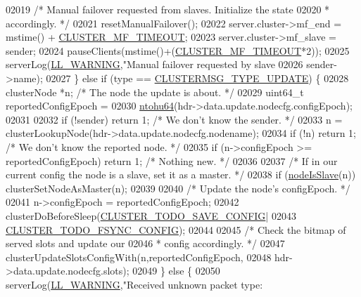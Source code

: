 \begin{DoxyCode}
{{{{{{{{{{{{{{{{{{{{{{{{{{{{{{{{{{02019         \textcolor{comment}{/* Manual failover requested from slaves. Initialize the state}
02020 \textcolor{comment}{         * accordingly. */}
02021         resetManualFailover();
02022         server.cluster->mf\_end = mstime() + \hyperlink{cluster_8h_a869ee97118edc95fc7ba2abe472ef79e}{CLUSTER\_MF\_TIMEOUT};
02023         server.cluster->mf\_slave = sender;
02024         pauseClients(mstime()+(\hyperlink{cluster_8h_a869ee97118edc95fc7ba2abe472ef79e}{CLUSTER\_MF\_TIMEOUT}*2));
02025         serverLog(\hyperlink{server_8h_a31229b9334bba7d6be2a72970967a14b}{LL\_WARNING},\textcolor{stringliteral}{"Manual failover requested by slave %
02026             sender->name);
02027     \} \textcolor{keywordflow}{else} \textcolor{keywordflow}{if} (type == \hyperlink{cluster_8h_a51dc58bb78128fcae1751d654130ec0f}{CLUSTERMSG\_TYPE\_UPDATE}) \{
02028         clusterNode *n; \textcolor{comment}{/* The node the update is about. */}
02029         uint64\_t reportedConfigEpoch =
02030                     \hyperlink{endianconv_8h_ab6e7416a2faac85cd6d50180e7348a1b}{ntohu64}(hdr->data.update.nodecfg.configEpoch);
02031 
02032         \textcolor{keywordflow}{if} (!sender) \textcolor{keywordflow}{return} 1;  \textcolor{comment}{/* We don't know the sender. */}
02033         n = clusterLookupNode(hdr->data.update.nodecfg.nodename);
02034         \textcolor{keywordflow}{if} (!n) \textcolor{keywordflow}{return} 1;   \textcolor{comment}{/* We don't know the reported node. */}
02035         \textcolor{keywordflow}{if} (n->configEpoch >= reportedConfigEpoch) \textcolor{keywordflow}{return} 1; \textcolor{comment}{/* Nothing new. */}
02036 
02037         \textcolor{comment}{/* If in our current config the node is a slave, set it as a master. */}
02038         \textcolor{keywordflow}{if} (\hyperlink{cluster_8h_a3c99881f6892130c902b42b1f84a0e11}{nodeIsSlave}(n)) clusterSetNodeAsMaster(n);
02039 
02040         \textcolor{comment}{/* Update the node's configEpoch. */}
02041         n->configEpoch = reportedConfigEpoch;
02042         clusterDoBeforeSleep(\hyperlink{cluster_8h_a0ae5ff08fbae3c655012b4de8bfc327d}{CLUSTER\_TODO\_SAVE\_CONFIG}|
02043                              \hyperlink{cluster_8h_accc9a00230cd04789db2398bb3ab715a}{CLUSTER\_TODO\_FSYNC\_CONFIG});
02044 
02045         \textcolor{comment}{/* Check the bitmap of served slots and update our}
02046 \textcolor{comment}{         * config accordingly. */}
02047         clusterUpdateSlotsConfigWith(n,reportedConfigEpoch,
02048             hdr->data.update.nodecfg.slots);
02049     \} \textcolor{keywordflow}{else} \{
02050         serverLog(\hyperlink{server_8h_a31229b9334bba7d6be2a72970967a14b}{LL\_WARNING},\textcolor{stringliteral}{"Received unknown packet type: %
}}}}}}}}}}}}}}}}}}}}}}}}}}}}}}}}}}}}
\end{DoxyCode}
